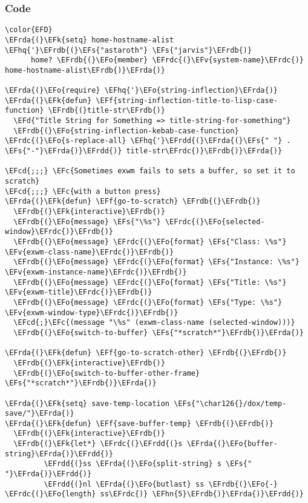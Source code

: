 \documentclass[a4wide,10pt]{article}
\newcommand{\EFc}[1]{\textcolor{EFc}{#1}} %
\newcommand{\EFcd}[1]{\textcolor{EFcd}{#1}} %
\newcommand{\EFs}[1]{\textcolor{EFs}{#1}} %
\newcommand{\EFd}[1]{\textcolor{EFd}{#1}} %
\newcommand{\EFk}[1]{\textcolor{EFk}{#1}} %
\newcommand{\EFf}[1]{\textcolor{EFf}{#1}} %
\newcommand{\EFv}[1]{\textcolor{EFv}{#1}} %
\newcommand{\EFo}[1]{\textcolor{EFo}{#1}} %
\newcommand{\EFhn}[1]{\textcolor{EFhn}{\textbf{#1}}} %
\newcommand{\EFhq}[1]{\textcolor{EFhq}{#1}} %
\newcommand{\EFrda}[1]{\textcolor{EFrda}{#1}} %
\newcommand{\EFrdb}[1]{\textcolor{EFrdb}{#1}} %
\newcommand{\EFrdc}[1]{\textcolor{EFrdc}{#1}} %
\newcommand{\EFrdd}[1]{\textcolor{EFrdd}{#1}} %
\begin{document}
\subsubsection{Code}
\label{sec:org8466cb1}
\begin{Code}
\begin{Verbatim}
\color{EFD}
\EFrda{(}\EFk{setq} home-hostname-alist \EFhq{'}\EFrdb{(}\EFs{"astaroth"} \EFs{"jarvis"}\EFrdb{)}
      home? \EFrdb{(}\EFo{member} \EFrdc{(}\EFv{system-name}\EFrdc{)} home-hostname-alist\EFrdb{)}\EFrda{)}

\EFrda{(}\EFo{require} \EFhq{'}\EFo{string-inflection}\EFrda{)}
\EFrda{(}\EFk{defun} \EFf{string-inflection-title-to-lisp-case-function} \EFrdb{(}title-str\EFrdb{)}
  \EFd{"Title String for Something => title-string-for-something"}
  \EFrdb{(}\EFo{string-inflection-kebab-case-function} \EFrdc{(}\EFo{s-replace-all} \EFhq{'}\EFrdd{(}\EFrda{(}\EFs{" "} . \EFs{"-"}\EFrda{)}\EFrdd{)} title-str\EFrdc{)}\EFrdb{)}\EFrda{)}

\EFcd{;;;} \EFc{Sometimes exwm fails to sets a buffer, so set it to scratch}
\EFcd{;;;} \EFc{with a button press}
\EFrda{(}\EFk{defun} \EFf{go-to-scratch} \EFrdb{(}\EFrdb{)}
  \EFrdb{(}\EFk{interactive}\EFrdb{)}
  \EFrdb{(}\EFo{message} \EFs{"\%s"} \EFrdc{(}\EFo{selected-window}\EFrdc{)}\EFrdb{)}
  \EFrdb{(}\EFo{message} \EFrdc{(}\EFo{format} \EFs{"Class: \%s"} \EFv{exwm-class-name}\EFrdc{)}\EFrdb{)}
  \EFrdb{(}\EFo{message} \EFrdc{(}\EFo{format} \EFs{"Instance: \%s"} \EFv{exwm-instance-name}\EFrdc{)}\EFrdb{)}
  \EFrdb{(}\EFo{message} \EFrdc{(}\EFo{format} \EFs{"Title: \%s"} \EFv{exwm-title}\EFrdc{)}\EFrdb{)}
  \EFrdb{(}\EFo{message} \EFrdc{(}\EFo{format} \EFs{"Type: \%s"} \EFv{exwm-window-type}\EFrdc{)}\EFrdb{)}
  \EFcd{;}\EFc{(message "\%s" (exwm-class-name (selected-window)))}
  \EFrdb{(}\EFo{switch-to-buffer} \EFs{"*scratch*"}\EFrdb{)}\EFrda{)}

\EFrda{(}\EFk{defun} \EFf{go-to-scratch-other} \EFrdb{(}\EFrdb{)}
  \EFrdb{(}\EFk{interactive}\EFrdb{)}
  \EFrdb{(}\EFo{switch-to-buffer-other-frame} \EFs{"*scratch*"}\EFrdb{)}\EFrda{)}

\EFrda{(}\EFk{setq} save-temp-location \EFs{"\char126{}/dox/temp-save/"}\EFrda{)}
\EFrda{(}\EFk{defun} \EFf{save-buffer-temp} \EFrdb{(}\EFrdb{)}
  \EFrdb{(}\EFk{interactive}\EFrdb{)}
  \EFrdb{(}\EFk{let*} \EFrdc{(}\EFrdd{(}s \EFrda{(}\EFo{buffer-string}\EFrda{)}\EFrdd{)}
         \EFrdd{(}ss \EFrda{(}\EFo{split-string} s \EFs{" "}\EFrda{)}\EFrdd{)}
         \EFrdd{(}nl \EFrda{(}\EFo{butlast} ss \EFrdb{(}\EFo{-} \EFrdc{(}\EFo{length} ss\EFrdc{)} \EFhn{5}\EFrdb{)}\EFrda{)}\EFrdd{)}


\end{Verbatim}
\end{Code}
\end{document}
